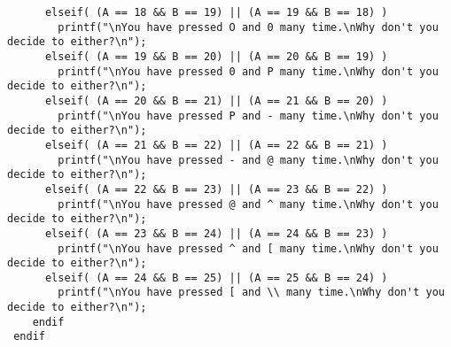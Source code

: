 {\begin{verbatim}
      elseif( (A == 18 && B == 19) || (A == 19 && B == 18) )
        printf("\nYou have pressed O and 0 many time.\nWhy don't you decide to either?\n");
      elseif( (A == 19 && B == 20) || (A == 20 && B == 19) )
        printf("\nYou have pressed 0 and P many time.\nWhy don't you decide to either?\n");
      elseif( (A == 20 && B == 21) || (A == 21 && B == 20) )
        printf("\nYou have pressed P and - many time.\nWhy don't you decide to either?\n");
      elseif( (A == 21 && B == 22) || (A == 22 && B == 21) )
        printf("\nYou have pressed - and @ many time.\nWhy don't you decide to either?\n");
      elseif( (A == 22 && B == 23) || (A == 23 && B == 22) )
        printf("\nYou have pressed @ and ^ many time.\nWhy don't you decide to either?\n");
      elseif( (A == 23 && B == 24) || (A == 24 && B == 23) )
        printf("\nYou have pressed ^ and [ many time.\nWhy don't you decide to either?\n");
      elseif( (A == 24 && B == 25) || (A == 25 && B == 24) )
        printf("\nYou have pressed [ and \\ many time.\nWhy don't you decide to either?\n");
    endif
 endif
 

\end{verbatim}}
